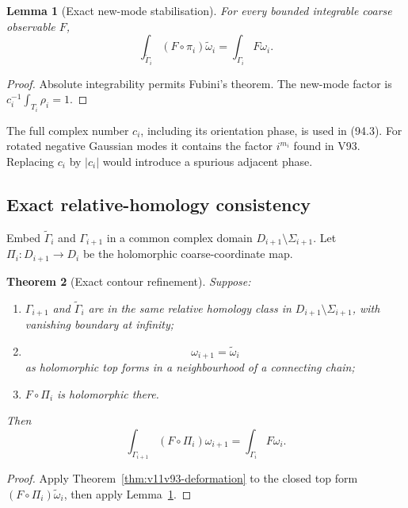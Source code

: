 \documentclass[11pt]{article}
\newtheorem{theorem}{Theorem}[section]
\newtheorem{lemma}[theorem]{Lemma}
\begin{document}
\begin{lemma}[Exact new-mode stabilisation]
\label{lem:v11v94-stabilise}
For every bounded integrable coarse observable \(F\),
\[
 \int_{\widetilde\Gamma_i}
       (F\circ\pi_i)\widetilde\omega_i
                         =\int_{\Gamma_i}F\omega_i.          \tag{94.4}
\]
\end{lemma}

\begin{proof}
Absolute integrability permits Fubini's theorem.  The new-mode factor
is \(c_i^{-1}\int_{T_i}\rho_i=1\).
\end{proof}

The full complex number \(c_i\), including its orientation phase, is
used in (94.3).  For rotated negative Gaussian modes it contains the
factor \(i^{m_i}\) found in V93.  Replacing \(c_i\) by \(|c_i|\)
would introduce a spurious adjacent phase.

\subsection{Exact relative-homology consistency}

Embed \(\widetilde\Gamma_i\) and \(\Gamma_{i+1}\) in a common complex
domain \(D_{i+1}\setminus\Sigma_{i+1}\).  Let
\(\Pi_i:D_{i+1}\to D_i\) be the holomorphic coarse-coordinate map.

\begin{theorem}[Exact contour refinement]
\label{thm:v11v94-exact}
Suppose:
\begin{enumerate}
\item \(\Gamma_{i+1}\) and \(\widetilde\Gamma_i\) are in the same
      relative homology class in
      \(D_{i+1}\setminus\Sigma_{i+1}\), with vanishing boundary at
      infinity;
\item
\[
                              \omega_{i+1}=\widetilde\omega_i
                                                                    \tag{94.5}
\]
      as holomorphic top forms in a neighbourhood of a connecting
      chain;
\item \(F\circ\Pi_i\) is holomorphic there.
\end{enumerate}
Then
\[
 \int_{\Gamma_{i+1}}(F\circ\Pi_i)\omega_{i+1}
                  =\int_{\Gamma_i}F\omega_i.                 \tag{94.6}
\]
\end{theorem}

\begin{proof}
Apply Theorem~\ref{thm:v11v93-deformation} to the closed top form
\((F\circ\Pi_i)\widetilde\omega_i\), then apply
Lemma~\ref{lem:v11v94-stabilise}.
\end{proof}
\end{document}
